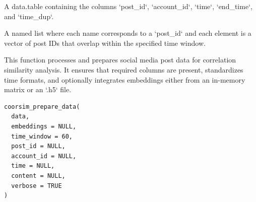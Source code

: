 \documentclass[a4paper]{book}
\begin{document}
%
\begin{Arguments}
\begin{ldescription}
\item[\code{data}] A data.table containing the columns `post\_id`, `account\_id`, `time`, `end\_time`, and `time\_dup`.
\end{ldescription}
\end{Arguments}
%
\begin{Value}
A named list where each name corresponds to a `post\_id` and each element is a vector of post IDs that overlap within the specified time window.
\end{Value}
%
\begin{Description}
This function processes and prepares social media post data for correlation similarity analysis.
It ensures that required columns are present, standardizes time formats, and optionally integrates
embeddings either from an in-memory matrix or an `.h5` file.
\end{Description}
%
\begin{Usage}
\begin{verbatim}
coorsim_prepare_data(
  data,
  embeddings = NULL,
  time_window = 60,
  post_id = NULL,
  account_id = NULL,
  time = NULL,
  content = NULL,
  verbose = TRUE
)
\end{verbatim}
\end{Usage}
%
\end{document}
